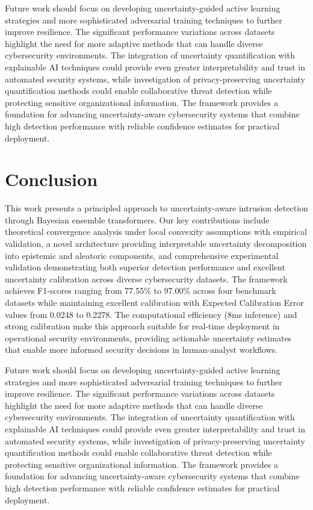 \documentclass[journal]{IEEEtran}
\begin{document}
Future work should focus on developing uncertainty-guided active learning strategies and more sophisticated adversarial training techniques to further improve resilience. The significant performance variations across datasets highlight the need for more adaptive methods that can handle diverse cybersecurity environments. The integration of uncertainty quantification with explainable AI techniques could provide even greater interpretability and trust in automated security systems, while investigation of privacy-preserving uncertainty quantification methods could enable collaborative threat detection while protecting sensitive organizational information. The framework provides a foundation for advancing uncertainty-aware cybersecurity systems that combine high detection performance with reliable confidence estimates for practical deployment.





\section{Conclusion}

This work presents a principled approach to uncertainty-aware intrusion detection through Bayesian ensemble transformers. Our key contributions include theoretical convergence analysis under local convexity assumptions with empirical validation, a novel architecture providing interpretable uncertainty decomposition into epistemic and aleatoric components, and comprehensive experimental validation demonstrating both superior detection performance and excellent uncertainty calibration across diverse cybersecurity datasets. The framework achieves F1-scores ranging from 77.55\% to 97.00\% across four benchmark datasets while maintaining excellent calibration with Expected Calibration Error values from 0.0248 to 0.2278. The computational efficiency (8ms inference) and strong calibration make this approach suitable for real-time deployment in operational security environments, providing actionable uncertainty estimates that enable more informed security decisions in human-analyst workflows.

Future work should focus on developing uncertainty-guided active learning strategies and more sophisticated adversarial training techniques to further improve resilience. The significant performance variations across datasets highlight the need for more adaptive methods that can handle diverse cybersecurity environments. The integration of uncertainty quantification with explainable AI techniques could provide even greater interpretability and trust in automated security systems, while investigation of privacy-preserving uncertainty quantification methods could enable collaborative threat detection while protecting sensitive organizational information. The framework provides a foundation for advancing uncertainty-aware cybersecurity systems that combine high detection performance with reliable confidence estimates for practical deployment.
\end{document}
